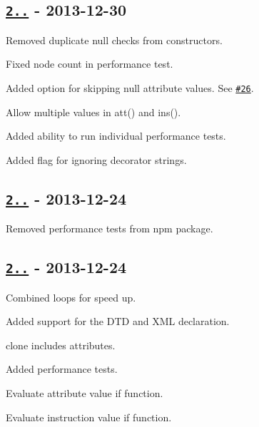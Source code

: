 \subsection*{\href{https://github.com/oozcitak/xmlbuilder-js/compare/v2.0.1...v2.1.0}{\tt 2..} -\/ 2013-\/12-\/30}


\begin{DoxyItemize}
\item Removed duplicate null checks from constructors.
\item Fixed node count in performance test.
\item Added option for skipping null attribute values. See \href{https://github.com/oozcitak/xmlbuilder-js/issues/26}{\tt \#26}.
\item Allow multiple values in {\ttfamily att()} and {\ttfamily ins()}.
\item Added ability to run individual performance tests.
\item Added flag for ignoring decorator strings.
\end{DoxyItemize}

\subsection*{\href{https://github.com/oozcitak/xmlbuilder-js/compare/v2.0.0...v2.0.1}{\tt 2..} -\/ 2013-\/12-\/24}


\begin{DoxyItemize}
\item Removed performance tests from npm package.
\end{DoxyItemize}

\subsection*{\href{https://github.com/oozcitak/xmlbuilder-js/compare/v1.1.2...v2.0.0}{\tt 2..} -\/ 2013-\/12-\/24}


\begin{DoxyItemize}
\item Combined loops for speed up.
\item Added support for the D\+TD and X\+ML declaration.
\item {\ttfamily clone} includes attributes.
\item Added performance tests.
\item Evaluate attribute value if function.
\item Evaluate instruction value if function.
\end{DoxyItemize}

